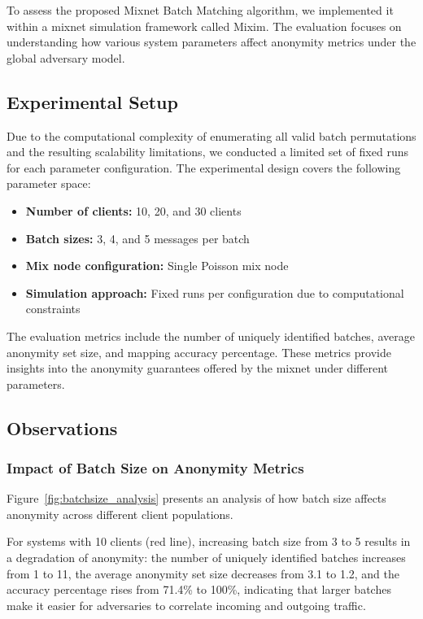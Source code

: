 \documentclass{article}
\begin{document}
To assess the proposed Mixnet Batch Matching 
algorithm, we implemented it within a mixnet simulation framework 
called Mixim. The evaluation focuses on understanding how various 
system parameters affect anonymity metrics under the global 
adversary model.

\subsection{Experimental Setup}

Due to the computational complexity of enumerating all valid batch 
permutations and the resulting scalability limitations, we 
conducted a limited set of fixed runs for each parameter 
configuration. The experimental design covers the following 
parameter space:

\begin{itemize}
\item \textbf{Number of clients:} 10, 20, and 30 clients
\item \textbf{Batch sizes:} 3, 4, and 5 messages per batch
\item \textbf{Mix node configuration:} Single Poisson mix node
\item \textbf{Simulation approach:} Fixed runs per configuration 
due to computational constraints
\end{itemize}

The evaluation metrics include the number of uniquely identified 
batches, average anonymity set size, and mapping accuracy percentage. 
These metrics provide insights into the anonymity guarantees offered 
by the mixnet under different parameters.

\subsection{Observations}

\subsubsection{Impact of Batch Size on Anonymity Metrics}

Figure~\ref{fig:batchsize_analysis} presents an analysis 
of how batch size affects anonymity across different 
client populations. 

For systems with 10 clients 
(red line), increasing batch size from 3 to 5 results in a 
degradation of anonymity: the number of uniquely 
identified batches increases from 1 to 11, the 
average anonymity set size decreases from 3.1 to 1.2, and the 
accuracy percentage rises from 71.4\% to 100\%, 
indicating that larger batches make it easier for 
adversaries to correlate incoming and outgoing traffic. 
\end{document}
